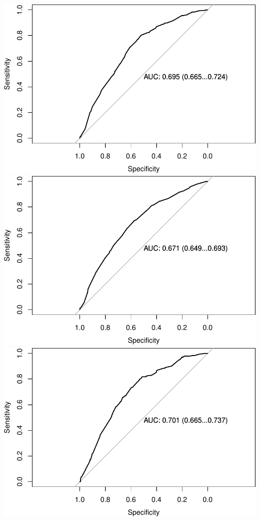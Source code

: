 \documentclass[11pt,]{article}
\begin{document}
\includegraphics{report2_files/figure-latex/plot-hac2011-males-1.pdf}
\includegraphics{report2_files/figure-latex/plot-hac2011-males-2.pdf}
\includegraphics{report2_files/figure-latex/plot-hac2011-males-3.pdf}
\end{document}
